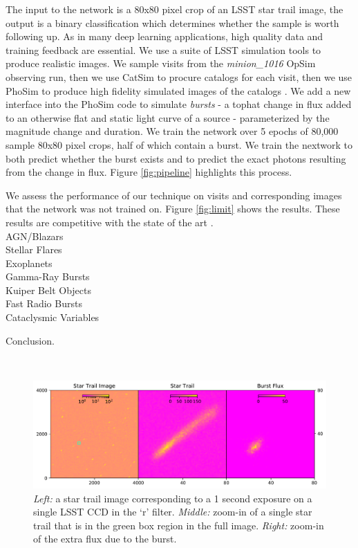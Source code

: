 \documentclass[12pt, letterpaper]{article}
\begin{document}
The input to the network is a 80x80 pixel crop of an LSST star trail image, the output is a binary classification which determines whether the sample is worth following up. As in many deep learning applications, high quality data and training feedback are essential. We use a suite of LSST simulation tools to produce realistic images. We sample visits from the \textit{minion\_1016} OpSim observing run, then we use CatSim to procure catalogs for each visit, then we use PhoSim to produce high fidelity simulated images of the catalogs \citep{2014SPIE.9150E..15D,2014SPIE.9150E..14C,2015ApJS..218...14P}. We add a new interface into the PhoSim code to simulate \textit{bursts} - a tophat change in flux added to an otherwise flat and static light curve of a source - parameterized by the magnitude change and duration. We train the network over 5 epochs of 80,000 sample 80x80 pixel crops, half of which contain a burst. We train the nextwork to both predict whether the burst exists and to predict the exact photons resulting from the change in flux. Figure \ref{fig:pipeline} highlights this process. 

We assess the performance of our technique on visits and corresponding images that the network was not trained on. Figure \ref{fig:limit} shows the results. These results are competitive with the state of the art \citep{2016SPIE.9908E..0YD}. 
\\

{\color{green}
\noindent AGN/Blazars\\
Stellar Flares\\
Exoplanets\\
Gamma-Ray Bursts\\
Kuiper Belt Objects\\
Fast Radio Bursts\\
Cataclysmic Variables\\
}

Conclusion.

\
\begin{figure}[htb]
\center
\includegraphics[width=1.00\columnwidth]{star_trail.pdf}
\caption{\textit{Left:} a star trail image corresponding to a 1 second exposure on a single LSST CCD in the `r' filter. \textit{Middle:} zoom-in of a single star trail that is in the green box region in the full image. \textit{Right:} zoom-in of the extra flux due to the burst.}
\label{fig:trail}
\end{figure}
\end{document}
